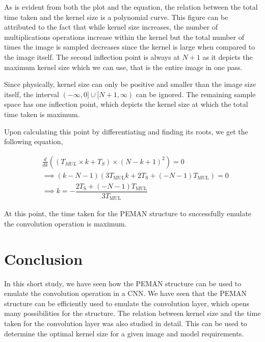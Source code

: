 \documentclass[wide]{adonis}
\begin{document}
As is evident from both the plot and the equation, the relation between the total time taken and the kernel size is a polynomial curve. This figure can be attributed to the fact that while kernel size increases, the number of multiplications operations increase within the kernel but the total number of times the image is sampled decreases since the kernel is large when compared to the image itself. The second inflection point is always at $N + 1$ as it depicts the maximum kernel size which we can use, that is the entire image in one pass.

Since physically, kernel size can only be positive and smaller than the image size itself, the interval $(- \infty,0]\cup[N + 1, \infty)$ can be ignored. The remaining sample space has one inflection point, which depicts the kernel size at which the total time taken is maximum.

Upon calculating this point by differentiating and finding its roots, we get the following equation,

\begin{equation}
	\label{eqn:kernel_time_max}
	\begin{split}
		&\frac{d}{dk} \left( (T_{MUL} \times k + T_S) \times (N - k + 1)^2 \right) = 0 \\
		&\implies \left(k-N-1\right)\left(3T_\text{MUL}k+2T_\text{S}+\left(-N-1\right)T_\text{MUL}\right) = 0 \\
		&\implies k = -\dfrac{2T_\text{S}+\left(-N-1\right)T_\text{MUL}}{3T_\text{MUL}}
	\end{split}
\end{equation}

At this point, the time taken for the PEMAN structure to successfully emulate the convolution operation is maximum.

\section{Conclusion}

In this short study, we have seen how the PEMAN structure can be used to emulate the convolution operation in a CNN. We have seen that the PEMAN structure can be efficiently used to emulate the convolution layer, which opens many possibilities for the structure. The relation between kernel size and the time taken for the convolution layer was also studied in detail. This can be used to determine the optimal kernel size for a given image and model requirements.
\end{document}
